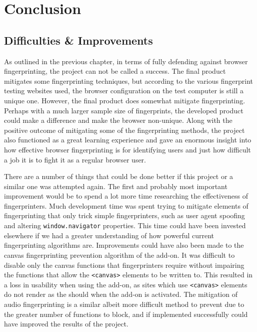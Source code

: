 \chapter{Conclusion}

\section{Difficulties \& Improvements}

As outlined in the previous chapter, in terms of fully defending against browser fingerprinting, the project can not be called a success.
The final product mitigates some fingerprinting techniques, but according to the various fingerprint testing websites used, the browser configuration on the test computer is still a unique one.
However, the final product does somewhat mitigate fingerprinting.
Perhaps with a much larger sample size of fingerprints, the developed product could make a difference and make the browser non-unique.
Along with the positive outcome of mitigating some of the fingerprinting methods, the project also functioned as a great learning experience and gave an enormous insight into how effective browser fingerprinting is for identifying users and just how difficult a job it is to fight it as a regular browser user.

There are a number of things that could be done better if this project or a similar one was attempted again.
The first and probably most important improvement would be to spend a lot more time researching the effectiveness of fingerprinters.
Much development time was spent trying to mitigate elements of fingerprinting that only trick simple fingerprinters, such as user agent spoofing and altering \texttt{window.navigator} properties.
This time could have been invested elsewhere if we had a greater understanding of how powerful current fingerprinting algorithms are.
Improvements could have also been made to the canvas fingerprinting prevention algorithm of the add-on.
It was difficult to disable only the canvas functions that fingerprinters require without impairing the functions that allow the \texttt{<canvas>} elements to be written to.
This resulted in a loss in usability when using the add-on, as sites which use \texttt{<canvas>} elements do not render as the should when the add-on is activated.
The mitigation of audio fingerprinting is a similar albeit more difficult method to prevent due to the greater number of functions to block, and if implemented successfully could have improved the results of the project.

